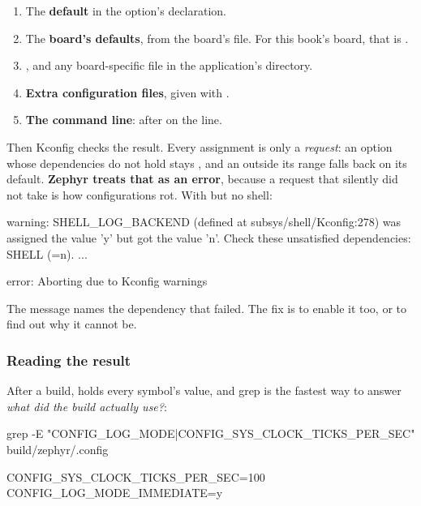 \begin{enumerate}
  \item The \textbf{default} in the option’s declaration.
  \item The \textbf{board’s defaults}, from the board’s  file. For this book’s board, that
    is .
  \item \textbf{}, and any board-specific  file in the application’s
     directory.
  \item \textbf{Extra configuration files}, given with .
  \item \textbf{The command line}:  after \code{--} on the  line.
\end{enumerate}

Then Kconfig checks the result. Every assignment is only a \emph{request}: an option whose
dependencies do not hold stays , and an  outside its range falls back on its
default. \textbf{Zephyr treats that as an error}, because a request that silently did not take is
how configurations rot. With  but no shell:

\begin{console}
warning: SHELL_LOG_BACKEND (defined at subsys/shell/Kconfig:278) was assigned the value 'y' but got
the value 'n'. Check these unsatisfied dependencies: SHELL (=n). ...

error: Aborting due to Kconfig warnings
\end{console}

\noindent The message names the dependency that failed. The fix is to enable it too, or to find out
why it cannot be.

\subsubsection{Reading the result}
After a build,  holds every symbol’s value, and grep is the fastest way
to answer \emph{what did the build actually use?}:

\begin{shell}
grep -E "CONFIG_LOG_MODE|CONFIG_SYS_CLOCK_TICKS_PER_SEC" build/zephyr/.config
\end{shell}

\begin{kconfigcode}
CONFIG_SYS_CLOCK_TICKS_PER_SEC=100
CONFIG_LOG_MODE_IMMEDIATE=y
\end{kconfigcode}

